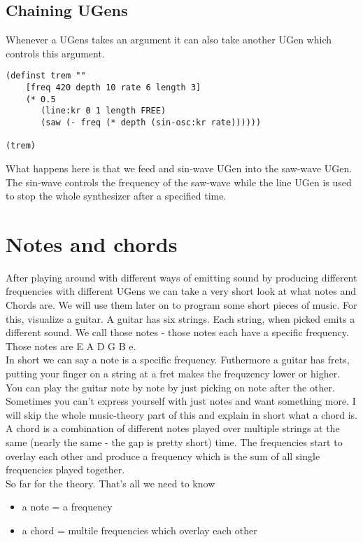 \subsection{Chaining UGens}
Whenever a UGens takes an argument it can also take another UGen which controls this argument.
\begin{lstlisting}
(definst trem ""
	[freq 420 depth 10 rate 6 length 3]
    (* 0.5
       (line:kr 0 1 length FREE)
       (saw (- freq (* depth (sin-osc:kr rate))))))

(trem)
\end{lstlisting}
What happens here is that we feed and sin-wave UGen into the saw-wave UGen. The sin-wave controls the frequency of the saw-wave while the line UGen is used to stop the whole synthesizer after a specified time.

\section{Notes and chords}
After playing around with different ways of emitting sound by producing different frequencies with different UGens we can take a very short look at what notes and Chords are. We will use them later on to program some short pieces of music.
For this, visualize a guitar. A guitar has six strings. Each string, when picked emits a different sound. We call those notes - those notes each have a specific frequency. Those notes are E A D G B e.\\
In short we can say a note is a specific frequency. Futhermore a guitar has frets, putting your finger on a string at a fret makes the frequzency lower or higher. You can play the guitar note by note by just picking on note after the other.\\ Sometimes you can't express yourself with just notes and want something more.
I will skip the whole music-theory part of this and explain in short what a chord is. A chord is a combination of different notes played over multiple strings at the same (nearly the same - the gap is pretty short) time. The frequencies start to overlay each other and produce a frequency which is the sum of all single frequencies played together.\\
So far for the theory. That's all we need to know
\begin{itemize}
	\item a note = a frequency
	\item a chord = multile frequencies which overlay each other
\end{itemize}


